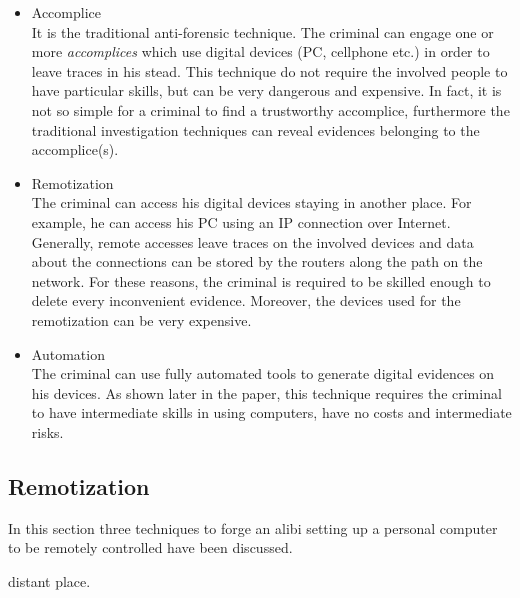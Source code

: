 \documentclass[runningheads,english]{llncs}
\begin{document}
\begin{itemize}
\item Accomplice\\
It is the traditional anti-forensic technique. The criminal can engage one or
more \emph{accomplices} which use digital devices (PC, cellphone etc.) in order
to leave traces in his stead. This technique do not require the involved people
to have particular skills, but can be very dangerous and expensive. In fact, it
is not so simple for a criminal to find a trustworthy accomplice, furthermore
the traditional investigation techniques can reveal evidences belonging to the
accomplice(s).
\item Remotization\\
The criminal can access his digital devices staying in another place. For
example, he can access his PC using an IP connection over Internet. Generally,
remote accesses leave traces on the involved devices and data about the
connections can be stored by the routers along the path on the network. For
these reasons, the criminal is required to be skilled enough to delete every
inconvenient evidence. Moreover, the devices used for the remotization can be
very expensive.
\item Automation\\
The criminal can use fully automated tools to generate digital evidences on his
devices. As shown later in the paper, this technique requires the criminal to
have intermediate skills in using computers, have no costs and intermediate
risks. 
\end{itemize}

\subsection{Remotization}
\label{sec:remotization}

In this section three techniques to forge an alibi setting up a personal
computer to be remotely controlled have been discussed.

distant place. 
\end{document}
